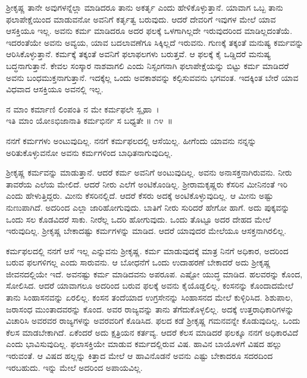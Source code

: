 ಶ‍್ರೀಕೃಷ್ಣ ತಾನೇ ಅವುಗಳನ್ನೆಲ್ಲಾ ಮಾಡಿದರೂ ತಾನು ಅಕರ್ತೃ ಎಂದು ಹೇಳಿಕೊಳ್ಳುತ್ತಾನೆ. ಯಾವಾಗ ಒಬ್ಬ ತಾನು ಫಲಾಪೇಕ್ಷೆಯಿಂದ ಮಾಡುವನೋ ಅವನಿಗೆ ಕರ್ತೃತ್ವ ಬರುವುದು. ಆದರೆ ದೇವರಿಗೆ ಇವುಗಳ ಮೇಲೆ ಯಾವ ಆಸಕ್ತಿಯೂ ಇಲ್ಲ. ಅವನು ಕರ್ಮ ಮಾಡಿದರೂ ಅದರ ಫಲಕ್ಕೆ ಒಳಗಾಗಿಲ್ಲದೇ ಇರುವುದರಿಂದ ಮಾಡಿಲ್ಲದಂತೆಯೆ. ಇದರಂತೆಯೇ ಅವನು ಅವ್ಯಯ, ಯಾವ ಬದಲಾವಣೆಗೂ ಸಿಕ್ಕಿಲ್ಲದೆ ಇರುವನು. ಗುಣಕ್ಕೆ ತಕ್ಕಂತೆ ಮನುಷ್ಯ ಕರ್ಮವನ್ನು ಆರಿಸಿಕೊಳ್ಳುತ್ತಾನೆ. ಕರ್ಮಕ್ಕೆ ತಕ್ಕಂತೆ ಅವನಿಗೆ ಫಲಾಫಲಗಳು ಬರುತ್ತವೆ. ಆ ಫಲಕ್ಕೆ ಕೈ ಒಡ್ಡಿದರೆ ಮನುಷ್ಯ ಬದ್ಧನಾಗುತ್ತಾನೆ. ಕೇವಲ ಸಂಸ್ಕಾರ ನಾಶವಾಗಲಿ ಎಂದು ನಿಸ್ಸಂಗನಾಗಿ ಫಲಾಪೇಕ್ಷೆಯನ್ನು ಬಿಟ್ಟು ಕರ್ಮ ಮಾಡಿದರೆ ಅವನು ಬಂಧಮುಕ್ತನಾಗುತ್ತಾನೆ. ಇದಕ್ಕೆಲ್ಲ ಒಂದು ಅವಕಾಶವನ್ನು ಕಲ್ಪಿಸುವವನು ಭಗವಂತ. ಇದಕ್ಕಿಂತ ಬೇರೆ ಯಾವ ವಿಧವಾದ ಆಸಕ್ತಿಯೂ ಅವನಲ್ಲಿ ಇಲ್ಲ.

\begin{shloka}
ನ ಮಾಂ ಕರ್ಮಾಣಿ ಲಿಂಪಂತಿ ನ ಮೇ ಕರ್ಮಫಲೇ ಸ್ಪೃಹಾ~।\\ಇತಿ ಮಾಂ ಯೋಽಭಿಜಾನಾತಿ ಕರ್ಮಭಿರ್ನ ಸ ಬಧ್ಯತೇ \hfill॥ ೧೪~॥
\end{shloka}

\begin{artha}
ನನಗೆ ಕರ್ಮಗಳು ಅಂಟುವುದಿಲ್ಲ. ನನಗೆ ಕರ್ಮಫಲದಲ್ಲಿ ಆಸೆಯಿಲ್ಲ. ಹೀಗೆಂದು ಯಾವನು ನನ್ನನ್ನು ಅರಿತುಕೊಳ್ಳುವನೋ ಅವನು ಕರ್ಮಗಳಿಂದ ಬಾಧಿತನಾಗುವುದಿಲ್ಲ.
\end{artha}

ಶ‍್ರೀಕೃಷ್ಣ ಕರ್ಮವನ್ನು ಮಾಡುತ್ತಾನೆ. ಆದರೆ ಕರ್ಮ ಅವನಿಗೆ ಅಂಟುವುದಿಲ್ಲ. ಅವನು ಅನಾಸಕ್ತನಾಗಿರುವನು. ನೀರು ತಾವರೆಯ ಎಲೆಯ ಮೇಲಿದೆ. ಆದರೆ ನೀರು ಎಲೆಗೆ ಅಂಟಿಕೊಂಡಿಲ್ಲ. ಶ‍್ರೀರಾಮಕೃಷ್ಣರು ಕೆಸರಿನ ಮೀನಿನಂತೆ ಇರಿ ಎಂದು ಹೇಳುತ್ತಿದ್ದರು. ಮೀನು ಕೆಸರಿನಲ್ಲಿದೆ. ಆದರೆ ಕೆಸರು ಅದಕ್ಕೆ ಅಂಟಿಕೊಳ್ಳುವುದಿಲ್ಲ. ಆ ಮೀನು ಅಷ್ಟು ನುಣುಪಾಗಿದೆ. ಅದರಿಂದ ಎಲ್ಲಾ ಜಾರಿಹೋಗುವುದು. ಬಾತಿಗೆ ನೀರು ಸುರಿದರೆ ಹೇಗೋ ಹಾಗೆ. ಅದು ಪುಕ್ಕವನ್ನು ಒಂದು ಸಲ ಕೊಡವಿದರೆ ಸಾಕು. ನೀರೆಲ್ಲ ಒದರಿ ಹೋಗುವುದು. ಒಂದು ತೊಟ್ಟೂ ಅದರ ದೇಹದ ಮೇಲೆ ಇರುವುದಿಲ್ಲ. ಶ‍್ರೀಕೃಷ್ಣ ಬೇಕಾದಷ್ಟು ಕರ್ಮಗಳನ್ನು ಮಾಡಿದ. ಆದರೆ ಯಾವುದರ ಮೇಲೆಯೂ ಆಸಕ್ತನಾಗಿರಲಿಲ್ಲ.

ಕರ್ಮಫಲದಲ್ಲಿ ನನಗೆ ಆಸೆ ಇಲ್ಲ ಎನ್ನುವನು ಶ‍್ರೀಕೃಷ್ಣ. ಕರ್ಮ ಮಾಡುವುದಕ್ಕೆ ಮಾತ್ರ ನಿನಗೆ ಅಧಿಕಾರ, ಅದರಿಂದ ಬರುವ ಫಲಗಳಿಗಲ್ಲ ಎಂದು ಸಾರುವನು. ಆ ಬೋಧನೆಗೆ ಒಂದು ಉದಾಹರಣೆ ಬೇಕಾದರೆ ಅದು ಶ‍್ರೀಕೃಷ್ಣ ಜೀವನದಲ್ಲಿಯೇ ಇದೆ. ಅವನಷ್ಟು ಕರ್ಮ ಮಾಡಿದವನು ಅಪರೂಪ. ಎಷ್ಟೋ ಯುದ್ಧ ಮಾಡಿದ. ಹಲವರನ್ನು ಕೊಂದ, ಸೋಲಿಸಿದ. ಆದರೆ ಯಾವಾಗಲೂ ಅದರಿಂದ ಬರುವ ಫಲಕ್ಕೆ ಅವನು ಕೈಯೊಡ್ಡಲಿಲ್ಲ. ಕಂಸನನ್ನು ಕೊಂದಾದಮೇಲೆ ತಾನು ಸಿಂಹಾಸನವನ್ನು ಏರಲಿಲ್ಲ. ಕಂಸನ ತಂದೆಯಾದ ಉಗ್ರಸೇನನ್ನು ಸಿಂಹಾಸನದ ಮೇಲೆ ಕುಳ್ಳಿರಿಸಿದ. ಶಿಶುಪಾಲ, ಜರಾಸಂಧ ಮುಂತಾದವರನ್ನು ಕೊಂದ. ಅವರ ರಾಜ್ಯವನ್ನು ತಾನು ತೆಗೆದುಕೊಳ್ಳಲಿಲ್ಲ. ಅದಕ್ಕೆ ಉತ್ತರಾಧಿಕಾರಿಗಳನ್ನು ವಿಚಾರಿಸಿ ಅವರವರ ರಾಜ್ಯಗಳನ್ನು ಅವರವರಿಗೆ ಕೊಡಿಸಿದ. ಫಲದ ಕಡೆ ಶ‍್ರೀಕೃಷ್ಣ ಗಮನವನ್ನೇ ಕೊಡುವುದಿಲ್ಲ. ಒಂದು ಕೆಲಸ ಮಾಡಬೇಕಾಗಿದೆ. ಏಕೆಂದರೆ ಅದು ಕ್ಷತ್ರಿಯನ ಕರ್ತವ್ಯ. ಆದರೆ ಕೆಲಸ ಮಾಡಿದರೆ ಫಲಕ್ಕೂ ನನಗೆ ಅಧಿಕಾರವಿದೆ ಎಂದು ಭಾವಿಸುವುದಿಲ್ಲ. ಫಲಾಸಕ್ತಿಯೇ ಮಾಡುವ ಕರ್ಮದಲ್ಲಿರುವ ವಿಷ. ಹಾವಿನ ಬಾಯೊಳಗೆ ವಿಷದ ಹಲ್ಲು ಇರುವಂತೆ. ಆ ವಿಷದ ಹಲ್ಲನ್ನು ಕಿತ್ತಾದ ಮೇಲೆ ಆ ಹಾವಿನೊಡನೆ ಅವನು ಎಷ್ಟು ಬೇಕಾದರೂ ಸದರದಿಂದ ಇರಬಹುದು. ಇನ್ನು ಮೇಲೆ ಅದರಿಂದ ಅಪಾಯವಿಲ್ಲ.

